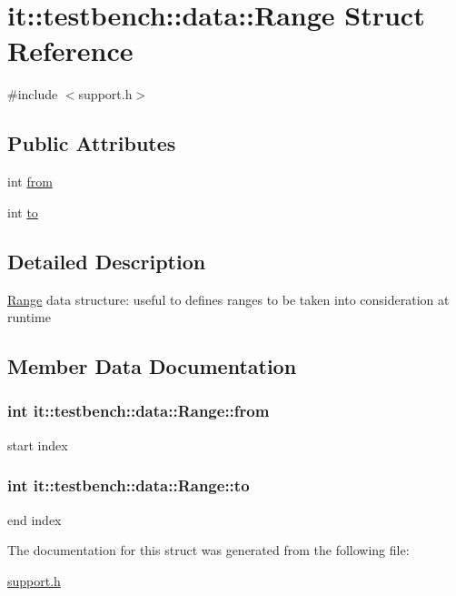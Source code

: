 \hypertarget{structit_1_1testbench_1_1data_1_1Range}{\section{it\-:\-:testbench\-:\-:data\-:\-:Range Struct Reference}
\label{d3/dd1/structit_1_1testbench_1_1data_1_1Range}
}


{\ttfamily \#include $<$support.\-h$>$}

\subsection*{Public Attributes}
\begin{DoxyCompactItemize}
\item 
int \hyperlink{structit_1_1testbench_1_1data_1_1Range_acf40e7f4a08ddc2a4ed23dee69e22265}{from}
\item 
int \hyperlink{structit_1_1testbench_1_1data_1_1Range_aeb17d65dfbbb0a0a95922f499def0610}{to}
\end{DoxyCompactItemize}


\subsection{Detailed Description}
\hyperlink{structit_1_1testbench_1_1data_1_1Range}{Range} data structure\-: useful to defines ranges to be taken into consideration at runtime 

\subsection{Member Data Documentation}
\hypertarget{structit_1_1testbench_1_1data_1_1Range_acf40e7f4a08ddc2a4ed23dee69e22265}{
\subsubsection[{from}]{\setlength{\rightskip}{0pt plus 5cm}int it\-::testbench\-::data\-::\-Range\-::from}}\label{d3/dd1/structit_1_1testbench_1_1data_1_1Range_acf40e7f4a08ddc2a4ed23dee69e22265}
start index \hypertarget{structit_1_1testbench_1_1data_1_1Range_aeb17d65dfbbb0a0a95922f499def0610}{
\subsubsection[{to}]{\setlength{\rightskip}{0pt plus 5cm}int it\-::testbench\-::data\-::\-Range\-::to}}\label{d3/dd1/structit_1_1testbench_1_1data_1_1Range_aeb17d65dfbbb0a0a95922f499def0610}
end index 

The documentation for this struct was generated from the following file\-:\begin{DoxyCompactItemize}
\item 
\hyperlink{support_8h}{support.\-h}\end{DoxyCompactItemize}
